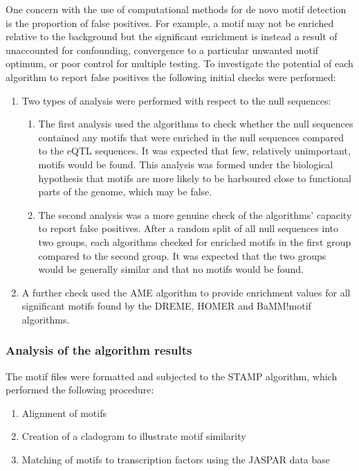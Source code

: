 \documentclass[12pt]{article}
\begin{document}
One concern with the use of computational methods for de novo motif detection is the proportion of false positives. For example, a motif may not be enriched relative to the background but the significant enrichment is instead a result of unaccounted for confounding, convergence to a particular unwanted motif optimum, or poor control for multiple testing. To investigate the potential of each algorithm to report false positives the following initial checks were performed:
\begin{enumerate}
\item Two types of analysis were performed with respect to the null sequences:
\begin{enumerate}
\item The first analysis used the algorithms to check whether the null sequences contained any motifs that were enriched in the null sequences compared to the eQTL sequences. It was expected that few, relatively unimportant, motifs would be found. This analysis was formed under the biological hypothesis that motifs are more likely to be harboured close to functional parts of the genome, which may be false.
\item The second analysis was a more genuine check of the algorithms' capacity to report false positives. After a random split of all null sequences into two groups, each algorithms checked for enriched motifs in the first group compared to the second group. It was expected that the two groups would be generally similar and that no motifs would be found. 
\end{enumerate}
\item A further check used the AME algorithm \citep{Buske2010} to provide enrichment values for all significant motifs found by the DREME, HOMER and BaMM!motif algorithms. 
\end{enumerate}

\subsubsection{Analysis of the algorithm results}

The motif files were formatted and subjected to the STAMP algorithm, which performed the following procedure:
\begin{enumerate}
\item Alignment of motifs
\item Creation of a cladogram to illustrate motif similarity
\item Matching of motifs to transcription factors using the JASPAR data base \citep{Mathelier2016}
\end{enumerate}
\end{document}
